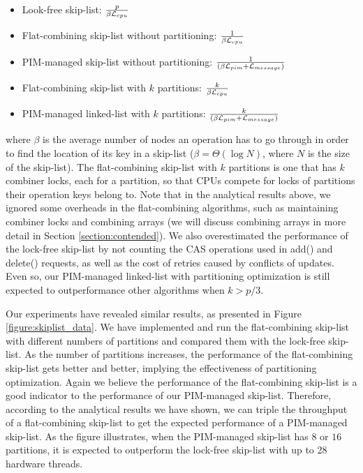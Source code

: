 \documentclass[11pt]{article}
\newcommand{\latpim} {\mathcal{L}_{pim}}
\newcommand{\latcpu} {\mathcal{L}_{cpu}}
\newcommand{\latmes} {\mathcal{L}_{message}}
\begin{document}
\begin{itemize}
\item Look-free skip-list:
	${p \over \beta\latcpu}$

\item Flat-combining skip-list without partitioning:
	${1 \over \beta\latcpu}$

\item PIM-managed skip-list without partitioning:
	${1 \over (\beta\latpim + \latmes)}$

\item Flat-combining skip-list with $k$ partitions:
    ${k \over \beta\latcpu}$

\item PIM-managed linked-list with $k$ partitions:
    ${k \over (\beta\latpim + \latmes)}$
\end{itemize}

where $\beta$ is the average number of nodes an operation has to go through
in order to find the location of its key in a skip-list
($\beta = \Theta(\log N)$, where $N$ is the size of the skip-list).
The flat-combining skip-list with $k$ partitions is one that has $k$ combiner locks,
each for a partition, so that CPUs compete for locks of partitions their operation
keys belong to.
Note that in the analytical results above, we ignored some overheads in the flat-combining
algorithms, such as maintaining combiner locks and combining arrays
(we will discuss combining arrays in more detail in Section \ref{section:contended}).
We also overestimated the performance of the lock-free skip-list by not counting the
CAS operations used in add() and delete() requests, as well as the cost of retries
caused by conflicts of updates.
Even so, our PIM-managed linked-list with partitioning optimization is
still expected to outperformance other algorithms when $k > p/3$.

Our experiments have revealed similar results, 
as presented in Figure \ref{figure:skiplist_data}.
We have implemented and run the flat-combining skip-list with different numbers of
partitions and compared them with the lock-free skip-list.
As the number of partitions increases, the performance of the flat-combining skip-list
gets better and better, implying the effectiveness of partitioning optimization.
Again we believe the performance of the flat-combining skip-list is a good indicator
to the performance of our PIM-managed skip-list.
Therefore, according to the analytical results we have shown, we can triple the throughput
of a flat-combining skip-list to get the expected performance of a PIM-managed skip-list.
As the figure illustrates, when the PIM-managed skip-list has $8$ or $16$ partitions,
it is expected to outperform the lock-free skip-list with up to 28 hardware threads.
\end{document}
